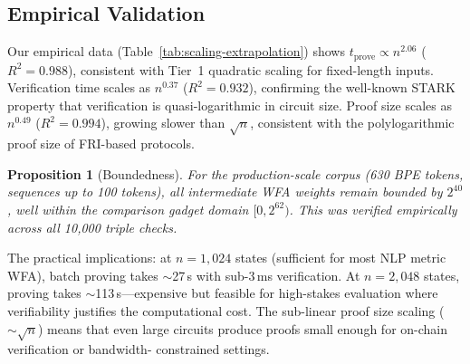 \documentclass[11pt]{article}
\newtheorem{proposition}[theorem]{Proposition}
\begin{document}
\subsection{Empirical Validation}

Our empirical data (Table~\ref{tab:scaling-extrapolation}) shows
$t_{\text{prove}} \propto n^{2.06}$ ($R^2 = 0.988$), consistent with
Tier~1 quadratic scaling for fixed-length inputs.  Verification time
scales as $n^{0.37}$ ($R^2 = 0.932$), confirming the well-known STARK
property that verification is quasi-logarithmic in circuit size.
Proof size scales as $n^{0.49}$ ($R^2 = 0.994$), growing slower than
$\sqrt{n}$, consistent with the polylogarithmic proof size of
FRI-based protocols.

\begin{proposition}[Boundedness]\label{prop:boundedness}
For the production-scale corpus (630 BPE tokens, sequences up to 100
tokens), all intermediate WFA weights remain bounded by $2^{40}$,
well within the comparison gadget domain $[0, 2^{62})$.  This was
verified empirically across all 10{,}000 triple checks.
\end{proposition}

The practical implications: at $n = 1{,}024$ states (sufficient for
most NLP metric WFA), batch proving takes ${\sim}$27\,s with
sub-3\,ms verification.  At $n = 2{,}048$ states, proving takes
${\sim}$113\,s---expensive but feasible for high-stakes evaluation
where verifiability justifies the computational cost.  The sub-linear
proof size scaling (${\sim}\sqrt{n}$) means that even large circuits
produce proofs small enough for on-chain verification or bandwidth-
constrained settings.
\end{document}
